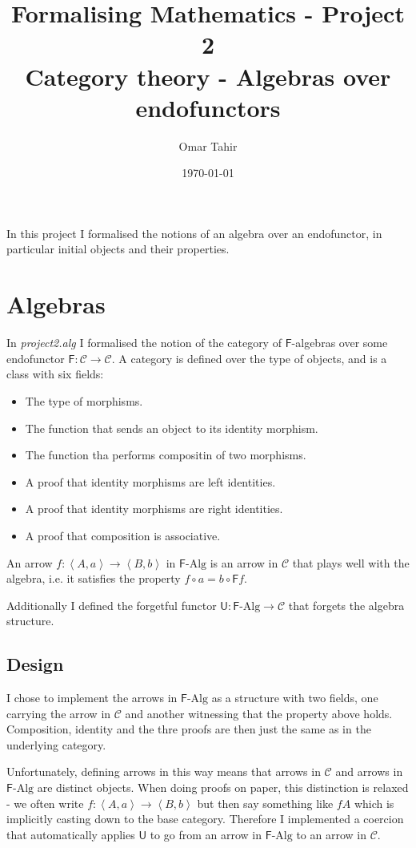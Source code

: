 \documentclass[a4paper, twoside, 11pt]{article}
\title{Formalising Mathematics - Project 2 \\ Category theory - Algebras over endofunctors}
\author{Omar Tahir}
\date{\today}
\theoremstyle{definition}
\theoremstyle{plain}
\theoremstyle{remark}
\newcommand{\alg}[1]{\mathsf{#1}\text{-Alg}}
\newcommand{\fun}[1]{\mathsf{#1}}
\newcommand{\cat}[1]{\mathcal{#1}}
\begin{document}
\maketitle

In this project I formalised the notions of an algebra over an endofunctor, in particular initial objects and their properties.

\section{Algebras}

In \emph{project2.alg} I formalised the notion of the category of $\fun{F}$-algebras over some endofunctor $\fun{F} : \cat{C} \to \cat{C}$. A category is defined over the type of objects, and is a class with six fields:

\begin{itemize}
    \item The type of morphisms.
    \item The function that sends an object to its identity morphism.
    \item The function tha performs compositin of two morphisms.
    \item A proof that identity morphisms are left identities.
    \item A proof that identity morphisms are right identities.
    \item A proof that composition is associative.
\end{itemize}

An arrow $f: \left< A,a\right> \to \left< B,b\right>$ in $\alg{F}$ is an arrow in $\cat{C}$ that plays well with the algebra, i.e. it satisfies the property $f \circ a = b \circ \fun{F} f$.

Additionally I defined the forgetful functor $\fun{U} : \alg{F} \to \cat{C}$ that forgets the algebra structure.

\subsection*{Design}

I chose to implement the arrows in $\alg{F}$ as a structure with two fields, one carrying the arrow in $\cat{C}$ and another witnessing that the property above holds. Composition, identity and the thre proofs are then just the same as in the underlying category.

Unfortunately, defining arrows in this way means that arrows in $\cat{C}$ and arrows in $\alg{F}$ are distinct objects. When doing proofs on paper, this distinction is relaxed - we often write $f: \left< A,a\right> \to \left< B,b\right>$ but then say something like $f A$ which is implicitly casting down to the base category. Therefore I implemented a coercion that automatically applies $\fun{U}$ to go from an arrow in $\alg{F}$ to an arrow in $\cat{C}$.
\end{document}
